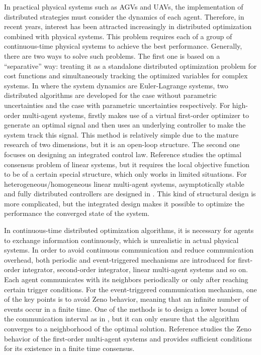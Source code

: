 \documentclass[final,5p,times,twocolumn,authoryear]{elsarticle}
\begin{document}
In practical physical systems such as AGVs and UAVs, the implementation of distributed strategies must consider the dynamics of each agent. Therefore, in recent years, interest has been attracted increasingly in distributed optimization combined with physical systems. This problem requires each of a group of continuous-time physical systems to achieve the best performance. Generally, there are two ways to solve such problems. The first one is based on a “separative” way: treating it as a standalone distributed optimization problem for cost functions and simultaneously tracking the optimized variables for complex systems. In \citet{zhang2017} where the system dynamics are Euler-Lagrange systems, two distributed algorithms are developed for the case without parametric uncertainties and the case with parametric uncertainties respectively. For high-order multi-agent systems, \citet{tang2019} firstly makes use of a virtual first-order optimizer to generate an optimal signal and then uses an underlying controller to make the system track this signal. This method is relatively simple due to the mature research of two dimensions, but it is an open-loop structure. The second one focuses on designing an integrated control law. Reference \citet{zhao2017} studies the optimal consensus problem of linear systems, but it requires the local objective function to be of a certain special structure, which only works in limited situations. For heterogeneous/homogeneous linear multi-agent systems, asymptotically stable and fully distributed controllers are designed in \citet{li2020,zhang2020}. This kind of structural design is more complicated, but the integrated design makes it possible to optimize the performance the converged state of the system.

In continuous-time distributed optimization algorithms, it is necessary for agents to exchange information continuously, which is unrealistic in actual physical systems. In order to avoid continuous communication and reduce communication overhead, both periodic and event-triggered mechanisms \citep{ding2018,ge2020} are introduced for first-order integrator\citep{kia2015,wu2020}, second-order integrator\citep{tran2018}, linear multi-agent systems\citep{li2020,lina2017,lxx2019} and so on. Each agent communicates with its neighbors periodically or only after reaching certain trigger conditions. For the event-triggered communication mechanism, one of the key points is to avoid Zeno behavior, meaning that an infinite number of events occur in a finite time. One of the methods is to design a lower bound of the communication interval as in \citet{kia2015}, but it can only ensure that the algorithm converges to a neighborhood of the optimal solution. Reference \citet{yu2020} studies the Zeno behavior of the first-order multi-agent systems and provides sufficient conditions for its existence in a finite time consensus.
\end{document}
